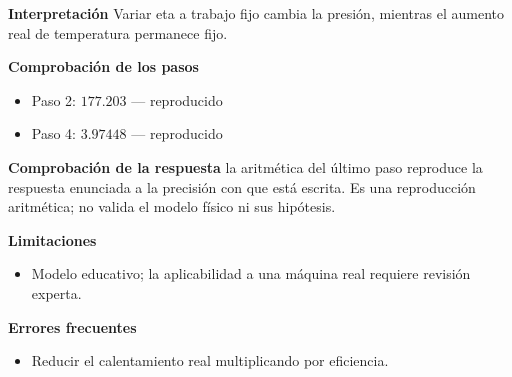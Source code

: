 \documentclass[10pt,openany]{book}
\begin{document}
\begin{tcolorbox}[title={Problema resuelto 2}, studiumworked, breakable]
\noindent\textbf{Interpretación}
Variar eta a trabajo fijo cambia la presión, mientras el aumento real de temperatura permanece fijo.

\noindent\textbf{Comprobación de los pasos}
\begin{itemize}
\item Paso 2: $177.203$ — reproducido
\item Paso 4: $3.97448$ — reproducido
\end{itemize}

\noindent\textbf{Comprobación de la respuesta} la aritmética del último paso reproduce la respuesta enunciada a la precisión con que está escrita. Es una reproducción aritmética; no valida el modelo físico ni sus hipótesis.

\noindent\textbf{Limitaciones}
\begin{itemize}
\item Modelo educativo; la aplicabilidad a una máquina real requiere revisión experta.
\end{itemize}

\noindent\textbf{Errores frecuentes}
\begin{itemize}
\item Reducir el calentamiento real multiplicando por eficiencia.
\end{itemize}
\end{tcolorbox}
\end{document}
